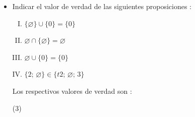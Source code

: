 \documentclass[10pt, twocolumn, landscape, a4paper]{article}
\begin{document}
\begin{itemize}
\item{Indicar el valor de verdad de las siguientes proposiciones :
\begin{enumerate}[I.]
\item{$\{\varnothing\} \cup \{0\} = \{0\}$}
\item{$\varnothing \cap \{\varnothing\} = \varnothing$}
\item{$\varnothing \cup \{0\} = \{0\}$}
\item{$\{2;\,\varnothing\} \in \{t2;\,\varnothing;\,3\}$}
\end{enumerate}
Los respectivos valores de verdad son : 
\begin{tasks}(3)
\end{tasks}}
\end{itemize}
\end{document}
